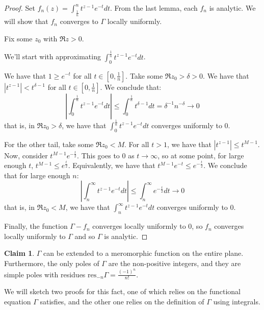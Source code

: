 \documentclass[11pt]{article} %
\theoremstyle{definition}
\newtheorem{claim}[theorem]{Claim}
\newcommand{\abs}[1]{\left|#1\right|}
\newcommand{\res}{\text{res}}
\begin{document}
\begin{proof}
Set $f_n\left(z\right) = \int_{\frac{1}{n}}^n t^{z-1}e^{-t}dt$. From the last lemma, each $f_n$ is analytic. We will show that $f_n$ converges to $\Gamma$ locally uniformly.

Fix some $z_0$ with $\Re z > 0$.

We'll start with approximating $\int_0^{\frac{1}{n}} t^{z-1} e^{-t} dt$.

We have that $1 \geq e^{-t}$ for all $t\in \left[0,\frac{1}{n}\right]$. Take some $\Re z_0 > \delta > 0$. We have that $\abs{t^{z-1}} < t^{\delta - 1}$ for all $t\in \left[0,\frac{1}{n}\right]$. We conclude that:
\[ \abs{\int_0^{\frac{1}{n}}t^{z-1} e^{-t} dt} \leq \int_0^{\frac{1}{n}} t^{\delta - 1} dt = \delta^{-1} n^{-\delta} \to 0\]
that is, in $\Re z_0 > \delta$, we have that $\int_0^{\frac{1}{n}}t^{z-1}e^{-t} dt$ converges uniformly to $0$.

For the other tail, take some $\Re z_0 < M$. For all $t > 1$, we have that $\abs{t^{z - 1}} \leq t^{M - 1}$. Now, consider $t^{M-1}e^{-\frac{t}{2}}$. This goes to $0$ as $t \to \infty$, so at some point, for large enough $t$, $t^{M-1} \leq e^{\frac{t}{2}}$. Equivalently, we have that $t^{M-1}e^{-t} \leq e^{-\frac{t}{2}}$. We conclude that for large enough $n$:
\[ \abs{\int _n ^\infty t^{z-1}e^{-t} dt} \leq \int_n ^\infty e^{-\frac{t}{2}}dt \to 0 \]
that is, in $\Re z_0 < M$, we have that $\int_n^\infty t^{z-1}e^{-t}dt$ converges uniformly to $0$.

Finally, the function $\Gamma - f_n$ converges locally uniformly to $0$, so $f_n$ converges locally uniformly to $\Gamma$ and so $\Gamma$ is analytic.
\end{proof}

\begin{claim}
$\Gamma$ can be extended to a meromorphic function on the entire plane. Furthermore, the only poles of $\Gamma$ are the non-positive integers, and they are simple poles with residues $\res_{-n} \Gamma = \frac{\left(-1\right)^n}{n!}$.
\end{claim}

We will sketch two proofs for this fact, one of which relies on the functional equation $\Gamma$ satisfies, and the other one relies on the definition of $\Gamma$ using integrals.
\end{document}
